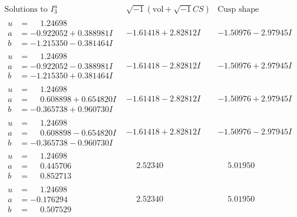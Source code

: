 \documentclass[1p]{elsarticle_modified}
\theoremstyle{definition}
\newcommand{\I}{\sqrt{-1}}
\begin{document}
$$\begin{array}{c|c|c}  
\text{Solutions to }I^u_{3}& \I (\text{vol} + \sqrt{-1}CS) & \text{Cusp shape}\\
 \hline 
\begin{aligned}
u &= \phantom{-}1.24698\phantom{ +0.000000I} \\
a &= -0.922052 + 0.388981 I \\
b &= -1.215350 - 0.381464 I\end{aligned}
 & -1.61418 + 2.82812 I & -1.50976 - 2.97945 I \\ \hline\begin{aligned}
u &= \phantom{-}1.24698\phantom{ +0.000000I} \\
a &= -0.922052 - 0.388981 I \\
b &= -1.215350 + 0.381464 I\end{aligned}
 & -1.61418 - 2.82812 I & -1.50976 + 2.97945 I \\ \hline\begin{aligned}
u &= \phantom{-}1.24698\phantom{ +0.000000I} \\
a &= \phantom{-}0.608898 + 0.654820 I \\
b &= -0.365738 + 0.960730 I\end{aligned}
 & -1.61418 - 2.82812 I & -1.50976 + 2.97945 I \\ \hline\begin{aligned}
u &= \phantom{-}1.24698\phantom{ +0.000000I} \\
a &= \phantom{-}0.608898 - 0.654820 I \\
b &= -0.365738 - 0.960730 I\end{aligned}
 & -1.61418 + 2.82812 I & -1.50976 - 2.97945 I \\ \hline\begin{aligned}
u &= \phantom{-}1.24698\phantom{ +0.000000I} \\
a &= \phantom{-}0.445706\phantom{ +0.000000I} \\
b &= \phantom{-}0.852713\phantom{ +0.000000I}\end{aligned}
 & \phantom{-}2.52340\phantom{ +0.000000I} & \phantom{-}5.01950\phantom{ +0.000000I} \\ \hline\begin{aligned}
u &= \phantom{-}1.24698\phantom{ +0.000000I} \\
a &= -0.176294\phantom{ +0.000000I} \\
b &= \phantom{-}0.507529\phantom{ +0.000000I}\end{aligned}
 & \phantom{-}2.52340\phantom{ +0.000000I} & \phantom{-}5.01950\phantom{ +0.000000I} \\ \hline\begin{aligned}

\end{aligned}
\end{array}$$
\end{document}
